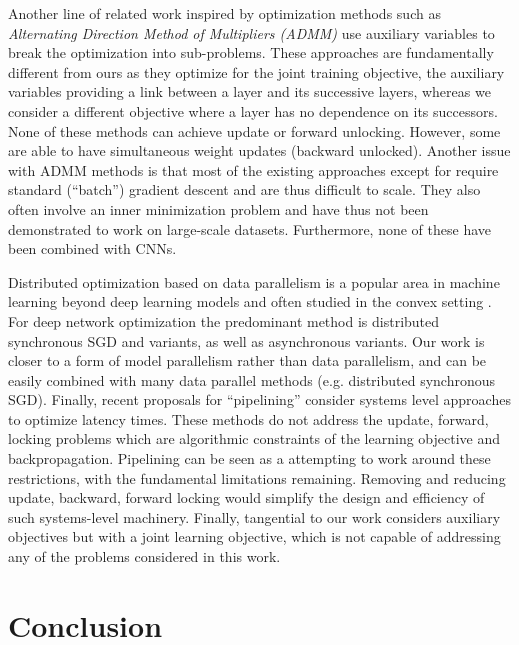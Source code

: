 \documentclass{article}
\begin{document}
Another line of  related work inspired by optimization methods such as \emph{Alternating Direction Method of Multipliers (ADMM)} \citep{admmNet, carreira2014distributed, choromanska2018beyond}  use auxiliary variables to break the optimization into sub-problems. These approaches are fundamentally different from ours as they optimize for the joint training objective, the auxiliary variables providing a link between a layer and its successive layers, whereas we consider a different objective where a layer %
has no dependence on its successors. None of these methods can achieve update or forward unlocking. However, some \citep{choromanska2018beyond} are able to have simultaneous weight updates (backward unlocked). Another issue with ADMM methods is that most of the existing approaches except for \citep{choromanska2018beyond} require standard (``batch'') gradient descent and are thus difficult to scale.
They also often involve an inner minimization problem and have thus not been demonstrated to work on large-scale datasets. Furthermore, none of these have been combined with CNNs.   

Distributed optimization based on data parallelism is a popular area  in machine learning beyond deep learning models and often studied in the convex setting \citep{JMLR:v19:17-650}. For deep network optimization the predominant method
is distributed synchronous SGD \citep{im1hr} and variants, as well as asynchronous  \citep{elasticSGD} variants. Our work is closer to a form of model parallelism rather than data parallelism, and can be easily combined with many data parallel methods (e.g. distributed synchronous SGD). Finally, recent proposals for ``pipelining'' \citep{huang2018gpipe} consider systems level approaches to optimize latency times. These methods do not address the update, forward, locking problems\citep{jaderberg2016decoupled} which are algorithmic constraints of the learning objective and backpropagation. Pipelining can be seen as a  attempting to work around these restrictions, with the fundamental limitations remaining. Removing and reducing update, backward, forward locking would simplify the design and efficiency of such systems-level machinery. Finally, tangential to our work \citet{lee2015deeply} considers auxiliary objectives but with a joint learning objective, which is not capable of addressing any of the problems considered in this work.  

\vspace{-6pt}
\section{Conclusion}
\end{document}
